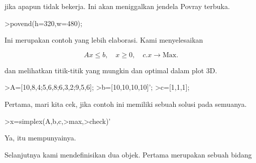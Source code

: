 \documentclass[a4paper,10pt]{article}
\begin{document}
\begin{eulernotebook}
\begin{eulercomment}
jika apapun tidak bekerja. Ini akan meniggalkan jendela Povray
terbuka.
\end{eulercomment}
\begin{eulerprompt}
>povend(h=320,w=480);
\end{eulerprompt}
\begin{eulercomment}
Ini merupakan contoh yang lebih elaborasi. Kami menyelesaikan

\end{eulercomment}
\begin{eulerformula}
\[
Ax \le b, \quad x \ge 0, \quad c.x \to \text{Max.}
\]
\end{eulerformula}
\begin{eulercomment}
dan melihatkan titik-titik yang mungkin dan optimal dalam plot 3D.
\end{eulercomment}
\begin{eulerprompt}
>A=[10,8,4;5,6,8;6,3,2;9,5,6];
>b=[10,10,10,10]';
>c=[1,1,1];
\end{eulerprompt}
\begin{eulercomment}
Pertama, mari kita cek, jika contoh ini memiliki sebuah solusi pada
semuanya.
\end{eulercomment}
\begin{eulerprompt}
>x=simplex(A,b,c,>max,>check)'
\end{eulerprompt}
\begin{euleroutput}
  [0,  1,  0.5]
\end{euleroutput}
\begin{eulercomment}
Ya, itu mempunyainya.

Selanjutnya kami mendefinisikan dua objek. Pertama merupakan sebuah
bidang


\end{eulercomment}
\end{eulernotebook}
\end{document}
